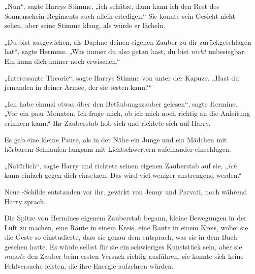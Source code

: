 „Nun“, sagte Harrys Stimme, „ich schätze, dann kann ich den Rest des Sonnenschein-Regiments auch allein erledigen.“ Sie konnte sein Gesicht nicht sehen, aber seine Stimme klang, als würde er lächeln.

„Du bist ausgewichen, als Daphne deinen eigenen Zauber zu dir zurückgeschlagen hat“, sagte Hermine. „Was immer du also getan hast, du bist \emph{nicht} unbesiegbar. Ein  kann dich immer noch erwischen.“

„Interessante Theorie“, sagte Harrys Stimme von unter der Kapuze. „Hast du jemanden in deiner Armee, der sie testen kann?“

„Ich habe einmal etwas über den Betäubungszauber gelesen“, sagte Hermine. „Vor ein paar Monaten. Ich frage mich, ob ich mich noch richtig an die Anleitung erinnern kann.“ Ihr Zauberstab hob sich und richtete sich auf Harry.

Es gab eine kleine Pause, als in der Nähe ein Junge und ein Mädchen mit hörbarem Schnaufen langsam mit Lichtschwertern aufeinander einschlugen.

„Natürlich“, sagte Harry und richtete seinen eigenen Zauberstab auf sie, „\emph{ich} kann einfach  gegen dich einsetzen. Das wird viel weniger anstrengend werden.“

Neue -Schilde entstanden vor ihr, gewirkt von Jenny und Parvati, noch während Harry sprach.

Die Spitze von Hermines eigenem Zauberstab begann, kleine Bewegungen in der Luft zu machen, eine Raute in einem Kreis, eine Raute in einem Kreis, wobei sie die Geste so einstudierte, dass sie genau dem entsprach, was sie in dem Buch gesehen hatte. Es würde selbst für sie ein schwieriges Kunststück sein, aber sie \emph{musste} den Zauber beim ersten Versuch richtig ausführen, sie konnte sich keine Fehlversuche leisten, die ihre Energie aufzehren würden.

